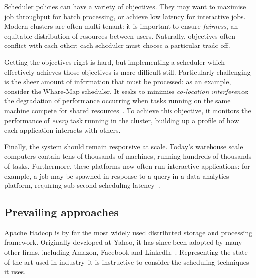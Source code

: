 Scheduler policies can have a variety of objectives. They may want to maximise job throughput for batch processing, or achieve low latency for interactive jobs. Modern clusters are often multi-tenant: it is important to ensure \emph{fairness}, an equitable distribution of resources between users. Naturally, objectives often conflict with each other: each scheduler must choose a particular trade-off.

Getting the objectives right is hard, but implementing a scheduler which effectively achieves those objectives is more difficult still. Particularly challenging is the sheer amount of information that must be processed: as an example, consider the Whare-Map scheduler. It seeks to minimise \emph{co-location interference}: the degradation of performance occurring when tasks running on the same machine compete for shared resources~\cite{Mars:2013}\footnotemark. To achieve this objective, it monitors the performance of \emph{every} task running in the cluster, building up a profile of how each application interacts with others.

Finally, the system should remain responsive at scale. Today's warehouse scale computers contain tens of thousands of machines, running hundreds of thousands of tasks. Furthermore, these platforms now often run interactive applications: for example, a job may be spawned in response to a query in a data analytics platform, requiring sub-second scheduling latency~\cite{Ousterhout:2013}.

\subsection{Prevailing approaches}


Apache Hadoop is by far the most widely used distributed storage and processing framework. Originally developed at Yahoo, it has since been adopted by many other firms, including Amazon, Facebook and LinkedIn~\cite{HadoopPoweredBy}. Representing the state of the art used in industry, it is instructive to consider the scheduling techniques it uses.

